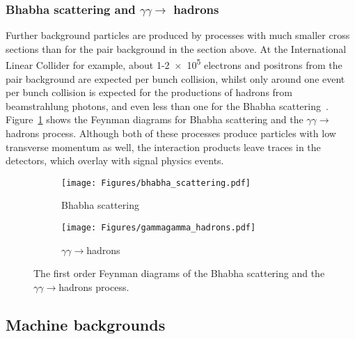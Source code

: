 \subsubsection{\texorpdfstring{Bhabha scattering and $\gamma\gamma\rightarrow$ hadrons}{Bhabha scattering and gamma gamma to hadrons background}}
\label{BeamBeam:bhabha_gammagamma}
Further background particles are produced by processes with much smaller cross sections than for the pair background in the section above.
At the International Linear Collider for example, about 1-\num{2e5} electrons and positrons from the pair background are expected per bunch collision, whilst only around one event per bunch collision is expected for the productions of hadrons from beamstrahlung photons, and even less than one for the Bhabha scattering~\cite{SiDBkgNote}. %
\\Figure~\ref{fig:Feynman:bhabha_gammagamma} shows the Feynman diagrams for Bhabha scattering and the $\gamma\gamma\rightarrow$ hadrons process. 
Although both of these processes produce particles with low transverse momentum as well, the interaction products leave traces in the detectors, which overlay with signal physics events.
\begin{figure}[h!]
\centering
\begin{subfigure}[b]{0.35\textwidth}
\texttt{[image: Figures/bhabha\_scattering.pdf]}
\caption{Bhabha scattering}
\end{subfigure}
\vspace*{0.2cm}
\begin{subfigure}[b]{0.35\textwidth}
\texttt{[image: Figures/gammagamma\_hadrons.pdf]}
\caption{$\gamma\gamma\rightarrow$hadrons}
\end{subfigure}
\caption[Feynman diagrams of Bhabha scattering and the $\gamma\gamma\rightarrow$hadrons process.]{The first order Feynman diagrams of the Bhabha scattering and the $\gamma\gamma\rightarrow$hadrons process.}
\label{fig:Feynman:bhabha_gammagamma}
\end{figure}

\subsection{Machine backgrounds}
\label{MachineBackgrounds}

